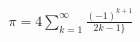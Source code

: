 \documentclass[preview]{standalone}
\begin{document}
\begin{align*}
\pi  = 4  \sum _{k=1}^{ \infty } \frac{ (-1)^{k+1} }{ 2k - 1 \}}
\end{align*}
\end{document}

